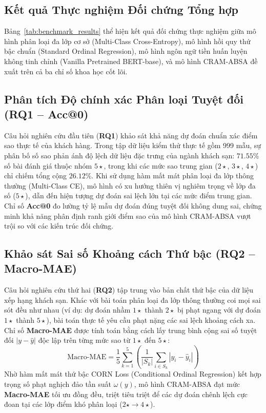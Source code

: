 \documentclass[pdflatex,sn-mathphys-num]{sn-jnl}
\theoremstyle{thmstyleone}
\theoremstyle{thmstyletwo}
\theoremstyle{thmstylethree}
\begin{document}
\subsection{Kết quả Thực nghiệm Đối chứng Tổng hợp}
\label{subsec:empirical_results}

Bảng~\ref{tab:benchmark_results} thể hiện kết quả đối chứng thực nghiệm giữa mô hình phân loại đa lớp cơ sở (Multi-Class Cross-Entropy), mô hình hồi quy thứ bậc chuẩn (Standard Ordinal Regression), mô hình ngôn ngữ tiền huấn luyện không tinh chỉnh (Vanilla Pretrained BERT-base), và mô hình CRAM-ABSA đề xuất trên cả ba chỉ số khoa học cốt lõi.



\subsection{Phân tích Độ chính xác Phân loại Tuyệt đối (RQ1 -- Acc@0)}
\label{subsec:analysis_rq1}

Câu hỏi nghiên cứu đầu tiên (\textbf{RQ1}) khảo sát khả năng dự đoán chuẩn xác điểm sao thực tế của khách hàng. Trong tập dữ liệu kiểm thử thực tế gồm 999 mẫu, sự phân bố số sao phản ánh độ lệch dữ liệu đặc trưng của ngành khách sạn: $71.55\%$ số bài đánh giá thuộc nhóm $5\star$, trong khi các mức sao trung gian ($2\star$, $3\star$, $4\star$) chỉ chiếm tổng cộng $26.12\%$. Khi sử dụng hàm mất mát phân loại đa lớp thông thường (Multi-Class CE), mô hình có xu hướng thiên vị nghiêm trọng về lớp đa số ($5\star$), dẫn đến hiện tượng dự đoán sai lệch lớn tại các mức điểm trung gian. Chỉ số \textbf{Acc@0} đo lường tỷ lệ mẫu dự đoán đúng tuyệt đối không dung sai, chứng minh khả năng phân định ranh giới điểm sao của mô hình CRAM-ABSA vượt trội so với các kiến trúc đối chứng.

\subsection{Khảo sát Sai số Khoảng cách Thứ bậc (RQ2 -- Macro-MAE)}
\label{subsec:analysis_rq2}

Câu hỏi nghiên cứu thứ hai (\textbf{RQ2}) tập trung vào bản chất thứ bậc của dữ liệu xếp hạng khách sạn. Khác với bài toán phân loại đa lớp thông thường coi mọi sai sót đều như nhau (ví dụ: dự đoán nhầm $1\star$ thành $2\star$ bị phạt ngang với dự đoán $1\star$ thành $5\star$), bài toán thực tế yêu cầu phạt nặng các sai lệch khoảng cách xa. Chỉ số \textbf{Macro-MAE} được tính toán bằng cách lấy trung bình cộng sai số tuyệt đối $|y - \hat{y}|$ độc lập trên từng mức sao từ $1\star$ đến $5\star$:
\begin{equation}
\text{Macro-MAE} = \frac{1}{5} \sum_{k=1}^{5} \left( \frac{1}{|S_k|} \sum_{i \in S_k} |y_i - \hat{y}_i| \right)
\end{equation}
Nhờ hàm mất mát thứ bậc CORN Loss (Conditional Ordinal Regression) kết hợp trọng số phạt nghịch đảo tần suất $\omega(y)$, mô hình CRAM-ABSA đạt mức \textbf{Macro-MAE} tối ưu đồng đều, triệt tiêu triệt để các dự đoán chênh lệch cực đoan tại các lớp điểm khó phân loại ($2\star \to 4\star$).
\end{document}
